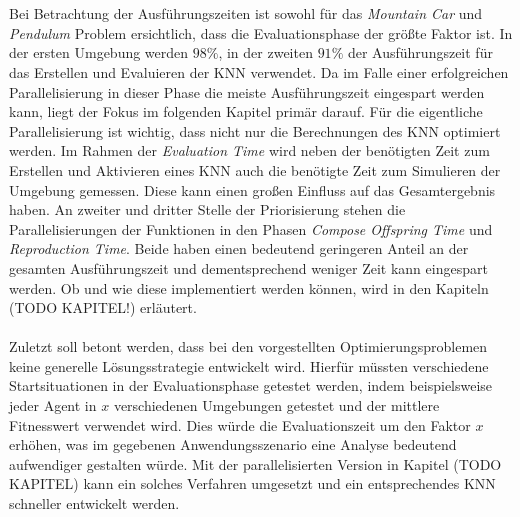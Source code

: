 \\\\
Bei Betrachtung der Ausführungszeiten ist sowohl für das \emph{Mountain Car} und \emph{Pendulum} Problem ersichtlich, dass die Evaluationsphase der größte Faktor ist. In der ersten Umgebung werden $98\%$, in der zweiten $91\%$ der Ausführungszeit für das Erstellen und Evaluieren der \ac{KNN} verwendet. Da im Falle einer erfolgreichen Parallelisierung in dieser Phase die meiste Ausführungszeit eingespart werden kann, liegt der Fokus im folgenden Kapitel primär darauf. Für die eigentliche Parallelisierung ist wichtig, dass nicht nur die Berechnungen des \ac{KNN} optimiert werden. Im Rahmen der \emph{Evaluation Time} wird neben der benötigten Zeit zum Erstellen und Aktivieren eines \ac{KNN} auch die benötigte Zeit zum Simulieren der Umgebung gemessen. Diese kann einen großen Einfluss auf das Gesamtergebnis haben. An zweiter und dritter Stelle der Priorisierung stehen die Parallelisierungen der Funktionen in den Phasen \emph{Compose Offspring Time} und \emph{Reproduction Time}. Beide haben einen bedeutend geringeren Anteil an der gesamten Ausführungszeit und dementsprechend weniger Zeit kann eingespart werden. Ob und wie diese implementiert werden können, wird in den Kapiteln (TODO KAPITEL!) erläutert. %
\\\\
Zuletzt soll betont werden, dass bei den vorgestellten Optimierungsproblemen keine generelle Lösungsstrategie entwickelt wird. Hierfür müssten verschiedene Startsituationen in der Evaluationsphase getestet werden, indem beispielsweise jeder Agent in $x$ verschiedenen Umgebungen getestet und der mittlere Fitnesswert verwendet wird. Dies würde die Evaluationszeit um den Faktor $x$ erhöhen, was im gegebenen Anwendungsszenario eine Analyse bedeutend aufwendiger gestalten würde. Mit der parallelisierten Version in Kapitel (TODO KAPITEL) kann ein solches Verfahren umgesetzt und ein entsprechendes \ac{KNN} schneller entwickelt werden.

